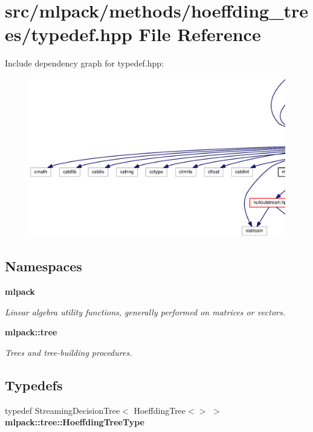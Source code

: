 \section{src/mlpack/methods/hoeffding\+\_\+trees/typedef.hpp File Reference}
\label{methods_2hoeffding__trees_2typedef_8hpp}
Include dependency graph for typedef.\+hpp\+:
\nopagebreak
\begin{figure}[H]
\begin{center}
\leavevmode
\includegraphics[width=350pt]{methods_2hoeffding__trees_2typedef_8hpp__incl}
\end{center}
\end{figure}
\subsection*{Namespaces}
\begin{DoxyCompactItemize}
\item 
 {\bf mlpack}
\begin{DoxyCompactList}\small\item\em Linear algebra utility functions, generally performed on matrices or vectors. \end{DoxyCompactList}\item 
 {\bf mlpack\+::tree}
\begin{DoxyCompactList}\small\item\em Trees and tree-\/building procedures. \end{DoxyCompactList}\end{DoxyCompactItemize}
\subsection*{Typedefs}
\begin{DoxyCompactItemize}
\item 
typedef Streaming\+Decision\+Tree$<$ Hoeffding\+Tree$<$$>$ $>$ {\bf mlpack\+::tree\+::\+Hoeffding\+Tree\+Type}
\end{DoxyCompactItemize}
